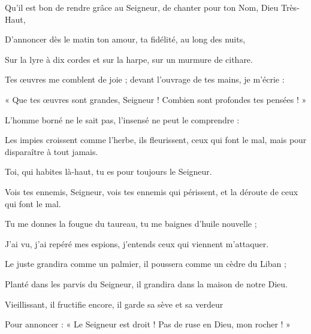 \item Qu'il est bon de rendre grâce au Seigneur, de chanter pour ton Nom, Dieu Très-Haut,
\item D'annoncer dès le matin ton amour, ta fidélité, au long des nuits,
\item Sur la lyre à dix cordes et sur la harpe, sur un murmure de cithare.
\item Tes œuvres me comblent de joie ; devant l'ouvrage de tes mains, je m'écrie :
\item « Que tes œuvres sont grandes, Seigneur ! Combien sont profondes tes pensées ! »
\item L'homme borné ne le sait pas, l'insensé ne peut le comprendre :
\item Les impies croissent comme l'herbe, ils fleurissent, ceux qui font le mal, mais pour disparaître à tout jamais.
\item Toi, qui habites là-haut, tu es pour toujours le Seigneur.
\item Vois tes ennemis, Seigneur, vois tes ennemis qui périssent, et la déroute de ceux qui font le mal.
\item Tu me donnes la fougue du taureau, tu me baignes d'huile nouvelle ;
\item J'ai vu, j'ai repéré mes espions, j'entends ceux qui viennent m'attaquer.
\item Le juste grandira comme un palmier, il poussera comme un cèdre du Liban ;
\item Planté dans les parvis du Seigneur, il grandira dans la maison de notre Dieu.
\item Vieillissant, il fructifie encore, il garde sa sève et sa verdeur
\item Pour annoncer : « Le Seigneur est droit ! Pas de ruse en Dieu, mon rocher ! »

